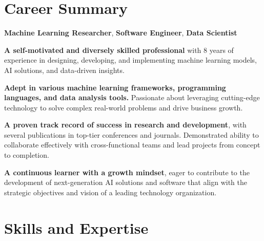\documentclass[10pt]{article}
\begin{document}
\maketitle

\section{Career Summary}

\begin{outerlist}
	\item \textbf{Machine Learning Researcher}, \textbf{Software Engineer}, \textbf{Data Scientist}
	\begin{innerlist}
		\item \textbf{A self-motivated and diversely skilled professional} with 8 years of experience in designing, developing, and implementing machine learning models, AI solutions, and data-driven insights.
    \item \textbf{Adept in various machine learning frameworks, programming languages, and data analysis tools.} Passionate about leveraging cutting-edge technology to solve complex real-world problems and drive business growth.
    \item \textbf{A proven track record of success in research and development}, with several publications in top-tier conferences and journals. Demonstrated ability to collaborate effectively with cross-functional teams and lead projects from concept to completion.
    \item \textbf{A continuous learner with a growth mindset}, eager to contribute to the development of next-generation AI solutions and software that align with the strategic objectives and vision of a leading technology organization.
	\end{innerlist}
\end{outerlist}


\section{Skills and Expertise}
\end{document}
